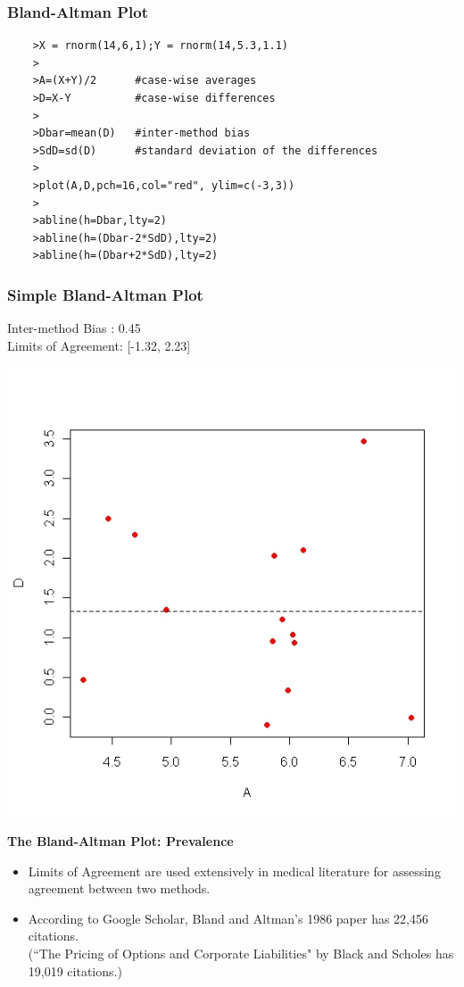 \documentclass{beamer}
\makeatletter
\newcommand{\tcb}{\textcolor{beamer@blendedblue}}
\makeatother
\begin{document}
\begin{frame}[fragile]
	\frametitle{Bland-Altman Plot}
	\vspace{-1cm}
	\begin{verbatim}
	>X = rnorm(14,6,1);Y = rnorm(14,5.3,1.1)
	>
	>A=(X+Y)/2		#case-wise averages
	>D=X-Y			#case-wise differences
	>		
	>Dbar=mean(D)	#inter-method bias
	>SdD=sd(D)		#standard deviation of the differences
	>
	>plot(A,D,pch=16,col="red", ylim=c(-3,3))
	>
	>abline(h=Dbar,lty=2)
	>abline(h=(Dbar-2*SdD),lty=2)
	>abline(h=(Dbar+2*SdD),lty=2)
	\end{verbatim}
\end{frame}


\begin{frame}
	\frametitle{Simple Bland-Altman Plot}
	
	Inter-method Bias : 0.45 \\
	Limits of Agreement: [-1.32, 2.23]
	\begin{center}
		\includegraphics[scale = 0.40]{SimpleBAplot}
	\end{center}
\end{frame}




\begin{frame}{\bf \tcb{The Bland-Altman Plot: Prevalence}}
	\begin{itemize}\itemsep0.7cm
		
		\item Limits of Agreement are used extensively in medical literature for assessing agreement between two methods.
		\item According to Google Scholar, Bland and Altman's 1986 paper has 22,456 citations. \\(``The Pricing of Options and Corporate Liabilities" by Black and Scholes has 19,019 citations.)
	\end{itemize}
\end{frame}

\end{document}
